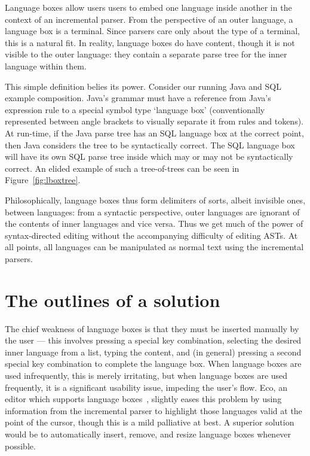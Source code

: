 \documentclass[sigplan,screen]{acmart}\settopmatter{printfolios=true,printccs=false,printacmref=false}
\begin{document}
Language boxes allow users users to embed one language inside another in the
context of an incremental parser. From the perspective of an outer language, a
language box is a terminal. Since
parsers care only about the type of a terminal, this is a natural fit. In
reality, language boxes do have content, though it is not visible to the outer
language: they contain a separate parse tree for the inner language within
them.

This simple definition belies its power. Consider our running Java and
SQL example composition. Java's grammar must have a reference from Java's
expression rule to a special symbol type `language box' (conventionally
represented between angle brackets to visually separate it from rules and
tokens). At run-time, if the Java parse tree has an SQL language box at the
correct point, then Java considers the tree to be syntactically correct. The
SQL language box will have its own SQL parse tree inside which may or may not
be syntactically correct. An elided example of such a tree-of-trees can be seen
in Figure~\ref{fig:lboxtree}.

Philosophically, language boxes thus form delimiters of sorts, albeit invisible
ones, between languages: from a syntactic perspective, outer languages are
ignorant of the contents of inner languages and vice versa. Thus we get much of
the power of syntax-directed editing without the accompanying difficulty of
editing ASTs. At all points, all languages can be manipulated as normal text
using the incremental parsers.


\section{The outlines of a solution}

\label{the problem}
The chief weakness of language boxes is that they must be inserted
manually by the user --- this involves pressing a special key combination,
selecting the desired inner language from a list, typing the content, and (in
general) pressing a second special key combination to complete the language box.
When language boxes are used infrequently, this is merely irritating,
but when language boxes are used frequently, it is a significant usability
issue, impeding the user's flow. Eco, an editor which supports language boxes~\cite{diekmann14eco},
slightly eases this problem by using information from the incremental parser to
highlight those languages valid at the point of the cursor,
though this is a mild palliative at best. A superior solution would be
to automatically insert, remove, and resize language boxes whenever possible.
\end{document}
